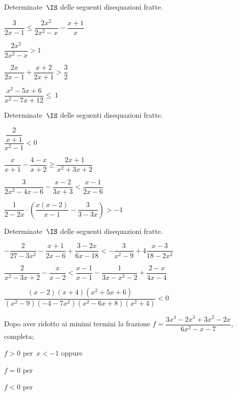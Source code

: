 \begin{esercizio}[\Ast]
\label{ese:21.62}
Determinate~\(\IS\) delle seguenti disequazioni fratte.
\begin{multicols}{2}
\begin{enumeratea}
\spazielenx
 \item \(\dfrac{3}{2x-1}\le \dfrac{2x^{2}}{2x^{2}-x}-\dfrac{x+1}{x}\)
\item \(\dfrac{2x^{2}}{2x^{2}-x}>1\)
\item \(\dfrac{2x}{2x-1}+\dfrac{x+2}{2x+1}>\dfrac{3}{2}\)
\item \(\dfrac{x^{2}-5x+6}{x^{2}-7x+12}\le~1\)
\end{enumeratea}
\end{multicols}
\end{esercizio}

\begin{esercizio}[\Ast]
\label{ese:21.63}
Determinate~\(\IS\) delle seguenti disequazioni fratte.
\begin{multicols}{2}
\begin{enumeratea}
\spazielenx
 \item \(\dfrac{\dfrac{2}{x+1}}{x^{2}-1}<0\)
\item \(\dfrac{x}{x+1}-\dfrac{4-x}{x+2}\ge \dfrac{2x+1}{x^{2}+3x+2}\)
\item \(\dfrac{3}{2x^{2}-4x-6}-\dfrac{x-2}{3x+3}<\dfrac{x-1}{2x-6}\)
\item \(\dfrac{1}{2-2x}\cdot \left(\dfrac{x(x-2)}{x-1}-\dfrac{3}{3-3x}\right)>-1\)
\end{enumeratea}
\end{multicols}
\end{esercizio}

\begin{esercizio}[\Ast]
\label{ese:21.64}
Determinate~\(\IS\) delle seguenti disequazioni fratte.

\begin{enumeratea}
 \item \(-{\dfrac{2}{27-3x^{2}}}-\dfrac{x+1}{2x-6}+\dfrac{3-2x}{6x-18}<-{\dfrac{3}{x^{2}-9}}+4\dfrac{x-3}{18-2x^{2}}\)
\item \(\dfrac{2}{x^{2}-3x+2}-\dfrac{x}{x-2}<\dfrac{x-1}{x-1}-\dfrac{1}{3x-x^{2}-2}+\dfrac{2-x}{4x-4}\)
\item \(\dfrac{(x-2)(x+4)(x^{2}+5x+6)}{(x^{2}-9)(-4-7x^{2})(x^{2}-6x+8)(x^{2}+4)}<0\)
\end{enumeratea}
\end{esercizio}

\begin{esercizio}
\label{ese:21.65}
Dopo aver ridotto ai minimi termini la frazione
\(f=\dfrac{3x^{4}-2x^{3}+3x^{2}-2x}{6x^{2}-x-7}\), completa;

 \begin{enumeratea}
 \item \(f>0\) per~\(x<-1\) oppure \dotfill
 \item \(f=0\) per \dotfill
 \item \(f<0\) per \dotfill
 \end{enumeratea}
\end{esercizio}

